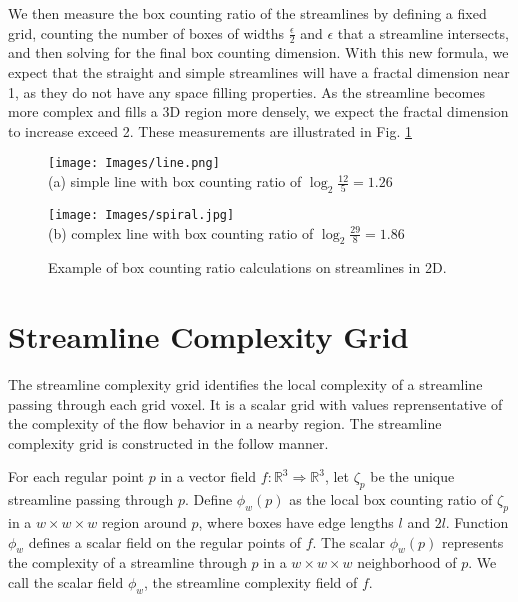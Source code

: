 \documentclass{egpubl}
\newcommand {\emath}[1]  {\ensuremath{#1}}
\newcommand {\Real}[1]   {\emath{\mathbb{R}^{#1}}}   %
\newcommand {\Rthree}    {\Real{3}}                  %
\newcommand {\gDim}[1]   {\emath{#1 \times #1 \times #1}} %
\begin{document}
We then measure the box counting ratio of the streamlines by defining a fixed grid, counting the number of boxes of widths $\frac{\epsilon}{2}$ and ${\epsilon}$ that a streamline intersects, and then solving for the final box counting dimension.
With this new formula, we expect that the straight and simple streamlines will have a fractal dimension near 1, as they do not have any space filling properties.
As the streamline becomes more complex and fills a 3D region more densely, we expect the fractal dimension to increase exceed 2.
These measurements are illustrated in Fig. \ref{fig:box_counting_calcs}

\begin{figure}[h]
        \centering
                \begin{minipage}{0.49\linewidth}
                        \small
                        \texttt{[image: Images/line.png]} \\ (a) simple line with box counting ratio of $\log_2\frac{12}{5} = 1.26$
                \end{minipage}
                \begin{minipage}{0.49\linewidth}
                        \small
                        \texttt{[image: Images/spiral.jpg]} \\ (b) complex line with box counting ratio of $\log_2\frac{29}{8} = 1.86$
                \end{minipage}
        \caption{Example of box counting ratio calculations on streamlines in 2D.}
        \label{fig:box_counting_calcs}
\end{figure}

\section{Streamline Complexity Grid} \label{sec:scg}

The streamline complexity grid identifies the local complexity of a streamline passing through each grid voxel.
It is a scalar grid with values reprensentative of the complexity of the flow behavior in a nearby region.
The streamline complexity grid is constructed in the follow manner.

For each regular point $p$ in a vector field $f: \Rthree \Rightarrow \Rthree$,
let $\zeta_p$ be the unique streamline passing through $p$.
Define $\phi_w(p)$ as the local box counting ratio of $\zeta_p$
in a $\gDim{w}$ region around $p$,
where boxes have edge lengths $l$ and $2l$.
Function $\phi_w$ defines a scalar field on the regular points of $f$.
The scalar $\phi_w(p)$ represents the complexity of a streamline through $p$ in a $\gDim{w}$ neighborhood of $p$.
We call the scalar field $\phi_w$, the streamline complexity field of $f$.
\end{document}
